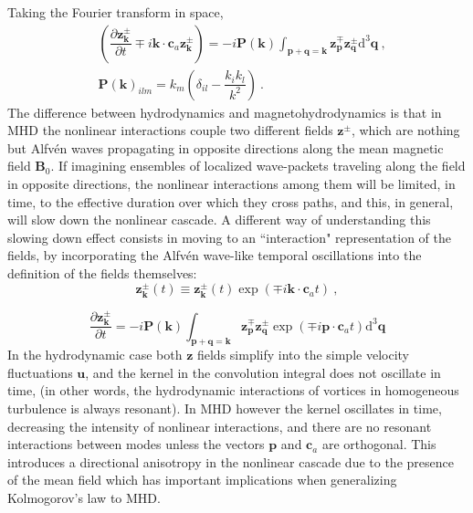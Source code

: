 \documentclass[12pt,a4paper]{article}
\renewcommand{\vec}[1]{\boldsymbol{#1}}
\newcommand{\dif}{\mathrm{d}}
\begin{document}
Taking the Fourier transform in space,
\begin{align}
& \left(\dfrac{\partial \vec{z}^\pm_{\vec{k}}}{\partial t} \mp i\vec{k}\cdot \vec{c}_a \vec{z}_{\vec{k}}^\pm \right) = -i \vec{P}(\vec{k}) \int_{\vec{p}+\vec{q}=\vec{k}} \vec{z}^\mp_{\vec{p}} \vec{z}^\pm_{\vec{q}} \dif^3 \vec{q} ~, \\
& \vec{P}(\vec{k})_{ilm} = k_m \left( \delta_{il} -\dfrac{k_ik_l}{k^2} \right) ~.
\end{align}
The difference between hydrodynamics and magnetohydrodynamics is that in MHD the nonlinear interactions couple two different fields $\vec{z}^\pm$, which are nothing but Alfvén waves propagating in opposite directions along the mean magnetic field $\vec{B}_0$. If imagining ensembles of localized wave-packets traveling along the field in opposite directions, the nonlinear interactions among them will be limited, in time, to the effective duration over which they cross paths, and this, in general, will slow down the nonlinear cascade. A different way of understanding this slowing down effect consists in moving to an ``interaction" representation of the fields, by incorporating the Alfv\'en wave-like temporal oscillations into the definition of the fields themselves:
\begin{equation}
\vec{z}^\pm_{\vec{k}}(t) \equiv \vec{z}^\pm_{\vec{k}}(t) \exp(\mp i \vec{k}\cdot \vec{c}_a t) ~,
\end{equation}

\begin{equation}
\dfrac{\partial \vec{z}^\pm_{\vec{k}}}{\partial t} = -i\vec{P}(\vec{k}) \int_{\vec{p}+\vec{q}=\vec{k}} \vec{z}^\mp_{\vec{p}} \vec{z}^\pm_{\vec{q}} \exp(\mp i \vec{p}\cdot \vec{c}_a t) \dif^3 \vec{q}
\end{equation}
In the hydrodynamic case both $\vec{z}$ fields simplify into the simple velocity fluctuations $\vec{u}$, and the kernel in the convolution integral does not oscillate in time, (in other words, the hydrodynamic interactions of vortices in homogeneous turbulence is always resonant). In MHD however the kernel oscillates in time, decreasing the intensity of nonlinear interactions, and there are no resonant interactions between modes unless the vectors $\vec{p}$ and $\vec{c}_a$ are orthogonal. This introduces a directional anisotropy in the nonlinear cascade due to the presence of the mean field which has important implications when generalizing Kolmogorov's law to MHD.
\end{document}
